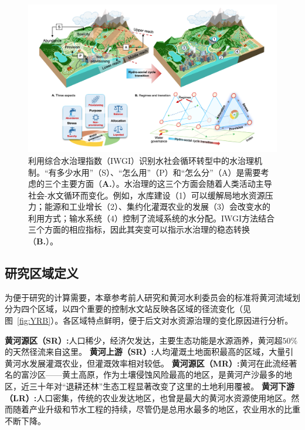 \begin{figure}[!ht]
\centering
\includegraphics[width=\textwidth]{img/ch4/framework.png}
\caption[利用综合水治理指数（IWGI）识别水社会循环转型中的水治理机制]{
    利用综合水治理指数（IWGI）识别水社会循环转型中的水治理机制。“有多少水用”（S）、“怎么用”（P）和“怎么分”（A）是需要考虑的三个主要方面（\textbf{A.}）。水治理的这三个方面会随着人类活动主导社会-水文循环而变化。例如，水库建设（1）可以缓解局地水资源压力；能源和工业增长（2）、集约化灌溉农业的发展（3）会改变水的利用方式；输水系统（4）控制了流域系统的水分配。IWGI方法结合三个方面的相应指标，因此其突变可以指示水治理的稳态转换（\textbf{B.}）。}\label{ch4:fig:framework}
\end{figure}

\subsection{研究区域定义}\label{ch4:sec:region}

为便于研究的计算需要，本章参考前人研究和黄河水利委员会的标准将黄河流域划分为四个区域，以四个重要的控制水文站反映各区域的径流变化（见图~\ref{fig:YRB}）\cite{shuilibuhuangheshuiliweiyuanhui,wang2019c,wang2016e}。各区域特点鲜明，便于后文对水资源治理的变化原因进行分析。

\textbf{黄河源区（SR）:}人口稀少，经济欠发达，主要生态功能是水源涵养，黄河超$50\%$的天然径流来自这里。
\textbf{黄河上游（SR）:}人均灌溉土地面积最高的区域，大量引黄河水发展灌溉农业，但灌溉效率相对较低。
\textbf{黄河源区（MR）:}黄河在此流经著名的富沙区——黄土高原，作为土壤侵蚀风险最高的地区，是黄河产沙最多的地区，近三十年对“退耕还林”生态工程显著改变了这里的土地利用覆被。
\textbf{黄河下游（LR）:}人口密集，传统的农业发达地区，也曾是最大的黄河水资源使用地区。然而随着产业升级和节水工程的持续，尽管仍是总用水最多的地区，农业用水的比重不断下降。


